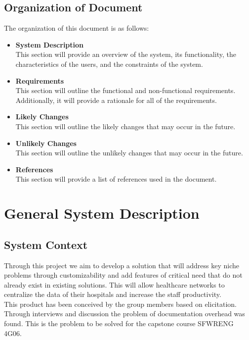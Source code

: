 \documentclass[12pt]{article}
\begin{document}
\subsection{Organization of Document} \label{sec_OrganizationOfDocument}

The organization of this document is as follows:
\begin{itemize}
  \item \textbf{System Description}\\
  This section will provide an overview of the system, its functionality, the characteristics of the users, and the constraints of the system.
  \item \textbf{Requirements}\\
  This section will outline the functional and non-functional requirements. Additionally, it will provide a rationale for all of the requirements.
  \item \textbf{Likely Changes}\\
  This section will outline the likely changes that may occur in the future.
  \item \textbf{Unlikely Changes}\\
  This section will outline the unlikely changes that may occur in the future.
  \item \textbf{References}\\
  This section will provide a list of references used in the document.

\end{itemize}


\section{General System Description} \label{sec_GeneralSystemDescription}

\subsection{System Context} \label{sec_SystemContext}

Through this project we aim to develop a solution that will address key niche problems through customizability and add features of critical need that do not already exist in existing solutions. This will allow healthcare networks to centralize the data of their hospitals and increase the staff productivity.\\

\noindent This product has been conceived by the group members based on elicitation. Through interviews and discussion the problem of documentation overhead was found. This is the problem to be solved for the capstone course SFWRENG 4G06.
\end{document}

